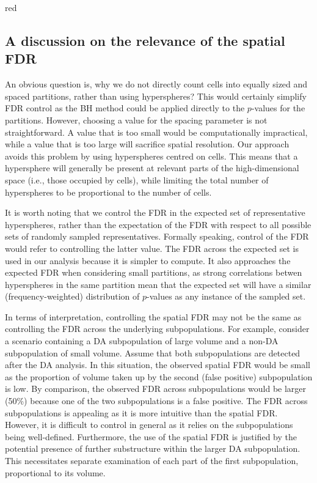 \documentclass{article}
\begin{document}
\begin{color}{red}
\subsection{A discussion on the relevance of the spatial FDR}
An obvious question is, why we do not directly count cells into equally sized and spaced partitions, rather than using hyperspheres?
This would certainly simplify FDR control as the BH method could be applied directly to the $p$-values for the partitions.
However, choosing a value for the spacing parameter is not straightforward.
A value that is too small would be computationally impractical, while a value that is too large will sacrifice spatial resolution.
Our approach avoids this problem by using hyperspheres centred on cells.
This means that a hypersphere will generally be present at relevant parts of the high-dimensional space (i.e., those occupied by cells), while limiting the total number of hyperspheres to be proportional to the number of cells.

It is worth noting that we control the FDR in the expected set of representative hyperspheres, rather than the expectation of the FDR with respect to all possible sets of randomly sampled representatives.
Formally speaking, control of the FDR would refer to controlling the latter value.
The FDR across the expected set is used in our analysis because it is simpler to compute.
It also approaches the expected FDR when considering small partitions, as strong correlations betwen hyperspheres in the same partition mean that the expected set will have a similar (frequency-weighted) distribution of $p$-values as any instance of the sampled set.

In terms of interpretation, controlling the spatial FDR may not be the same as controlling the FDR across the underlying subpopulations.
For example, consider a scenario containing a DA subpopulation of large volume and a non-DA subpopulation of small volume.
Assume that both subpopulations are detected after the DA analysis.
In this situation, the observed spatial FDR would be small as the proportion of volume taken up by the second (false positive) subpopulation is low.
By comparison, the observed FDR across subpopulations would be larger (50\%) because one of the two subpopulations is a false positive.
The FDR across subpopulations is appealing as it is more intuitive than the spatial FDR.
However, it is difficult to control in general as it relies on the subpopulations being well-defined.
Furthermore, the use of the spatial FDR is justified by the potential presence of further substructure within the larger DA subpopulation.
This necessitates separate examination of each part of the first subpopulation, proportional to its volume.


\end{color}
\end{document}
